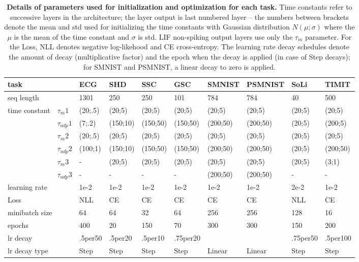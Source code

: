 \documentclass[fleqn,10pt]{wlscirep}
\begin{document}
\begin{table}[hb]
\centering
\caption{\textbf{Details of parameters used for initialization and optimization for each task.} Time constants refer to successive layers in the architecture; the layer output is last numbered layer -- the numbers between brackets denote the mean and std used for initializing the time constants with Gaussian distribution $N(\mu;\sigma)$ where the $\mu$ is the mean of the time constant and $\sigma$ is std. LIF non-spiking output layers use only the $\tau_m$ parameter. For the Loss, NLL denotes negative log-likehood and CE cross-entropy. The learning rate decay schedules denote the amount of decay (multiplicative factor) and the epoch when the decay is applied (in case of Step decays); for SMNIST and PSMNIST, a linear decay to zero is applied.}
\begin{tabular}{|l|l|l|l|l|l|l|l|l|l|}
\hline
\multicolumn{2}{|l|}{task}                 & ECG & SHD & SSC & GSC & SMNIST & PSMNIST & SoLi & TIMIT \\ \hline
\multicolumn{2}{|l|}{seq length}           &1301 &250  &250 &101 &784        &784         &40  &500       \\ \hline
\multirow{6}{*}{time constant} & $\tau_m1$  &(20;.5) &(20;5)&(20;5) &(20;5) &(20;5) &(20;5)  & (20;5)     &(20;5)       \\ \cline{2-10} 
                              &$\tau_{adp}1$&(7;.2)&(150;10)&(150;50) &(150;50) &(200;50)    &(200;50)  &(20;5)      &(200;5)       \\ \cline{2-10} 
                               & $\tau_m2$  &(20;.5)&(20;5)&(20;5)&(20;5) &(20;5)    &(20;5)    & (20;5)     &(20;5)       \\ \cline{2-10} 
                              &$\tau_{adp}2$&(100;1)&(150;10)&(150;50) &(150;50)&(200;50)&(200;50)  &(20;5)      &(200;50)       \\ \cline{2-10} 
                               &$\tau_m3$   & -  &(20;5)&(20;5)&(20;5)&(20;5)  &(20;5)    &(20;5)      &(3;1)  \\ \cline{2-10} 
                              &$\tau_{adp}3$& -  &  -  &  -   & -   &(200;50) &(200;50)   &   -   &  -     \\ \hline
\multicolumn{2}{|l|}{learning rate}        &1e-2 &1e-2 &1e-2 &1e-2&1e-2        &1e-2 &2e-2 &1e-2   \\ \hline
\multicolumn{2}{|l|}{Loss}                 &NLL &CE &CE &CE&CE    &CE     &NLL  &CE   \\ \hline
\multicolumn{2}{|l|}{minibatch size}        &64  &64   &32  &64&256        &256         &128 &16    \\ \hline
\multicolumn{2}{|l|}{epochs}               &400 &20  &150 &70 &300        &300         &150  &200       \\ \hline
\multicolumn{2}{|l|}{lr decay}             &.5per50    &.5per20  &.5per10 &.75per20 &        &         &.75per50  &.5per100       \\ \hline
\multicolumn{2}{|l|}{lr decay type}        &Step    &Step  &Step &Step &Linear        &Linear        &Step  &Step       \\ \hline
\end{tabular}
\label{tab:params}
\end{table}
\end{document}
